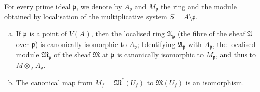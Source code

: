\documentclass{article}
\theoremstyle{plain}
\newenvironment{theorem}[1]
    {\renewcommand\theinnercustomtheorem{#1}\innercustomtheorem}
    {\endinnercustomtheorem}
\newcommand{\sh}{\mathfrak}
\begin{document}
For every prime ideal $\mathfrak{p}$, we denote by $A_\mathfrak{p}$ and $M_\mathfrak{p}$ the ring and the module obtained by localisation of the multiplicative system $S=A\setminus\mathfrak{p}$.

\begin{theorem}{1}
\label{theroem1}
  \begin{enumerate}[(a)]
    \item If $\mathfrak{p}$ is a point of $V(A)$, then the localised ring $\sh{A}_\mathfrak{p}$ (the fibre of the sheaf $\sh{A}$ over $\mathfrak{p}$) is canonically isomorphic to $A_\mathfrak{p}$;
      Identifying $\sh{A}_\mathfrak{p}$ with $A_\mathfrak{p}$, the localised module $\sh{M}_\mathfrak{p}$ of the sheaf $\sh{M}$ at $\mathfrak{p}$ is canonically isomorphic to $M_\mathfrak{p}$, and thus to $M\otimes_A A_\mathfrak{p}$.
    \item The canonical map from $M_f=\sh{M}^*(U_f)$ to $\sh{M}(U_f)$ is an isomorphism.
  \end{enumerate}
\end{theorem}
\end{document}

